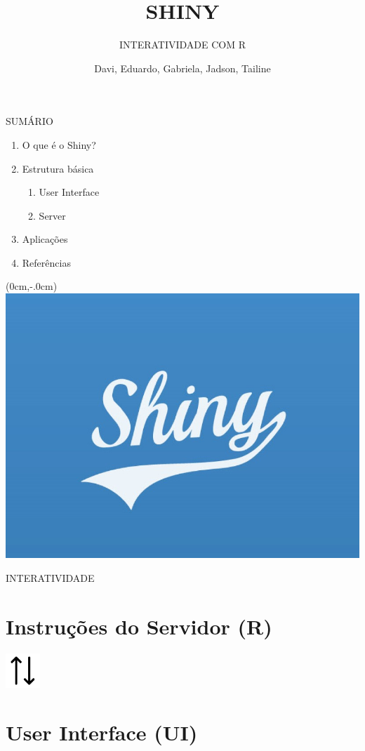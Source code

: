 \documentclass[
  ignorenonframetext,
]{beamer}
\title{SHINY}
\subtitle{INTERATIVIDADE COM R}
\author{Davi, Eduardo, Gabriela, Jadson, Tailine}
\date{}
\begin{document}
\frame{\titlepage}

\begin{frame}{SUMÁRIO}
\protect\hypertarget{sumario}{}

\begin{enumerate}
\item O que é o Shiny?
\item Estrutura básica
\begin{enumerate}
\item User Interface
\item Server
\end{enumerate}
\item Aplicações
\item Referências
\end{enumerate}

\end{frame}

\begin{frame}{}
\protect\hypertarget{section}{}

\begin{textblock*}{0cm}(0cm,-.0cm)
\includegraphics[width=\paperwidth, height=\paperheight]{imagens/logo}
\end{textblock*}

\end{frame}

\begin{frame}{INTERATIVIDADE}
\protect\hypertarget{interatividade}{}

\section{Instruções do Servidor (R)}
\begin{center}
\includegraphics[width=13mm]{imagens/trade}
\end{center}
\section{User Interface (UI)}

\end{frame}
\end{document}
